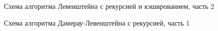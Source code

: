 \begin{figure}
	\caption{Схема алгоритма Левенштейна с рекурсией и кэшированием, часть 2}
\end{figure}

\begin{figure}
	\caption{Схема алгоритма Дамерау-Левенштейна с рекурсией, часть 1}
\end{figure}

